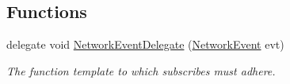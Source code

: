 \subsection*{Functions}
\begin{DoxyCompactItemize}
\item 
delegate void \hyperlink{namespace_skyrates_1_1_common_1_1_network_a87882c06bd9c9c4138d4e098242f7b67}{Network\-Event\-Delegate} (\hyperlink{class_skyrates_1_1_common_1_1_network_1_1_event_1_1_network_event}{Network\-Event} evt)
\begin{DoxyCompactList}\small\item\em The function template to which subscribes must adhere. \end{DoxyCompactList}\end{DoxyCompactItemize}


